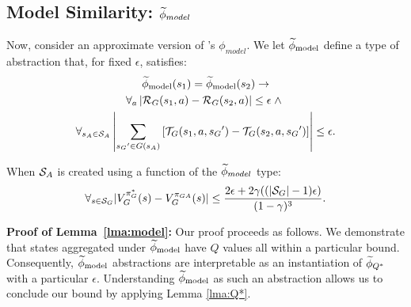 \subsection{Model Similarity: $\widetilde \phi_{model}$}
\label{sec:model}

Now, consider an approximate version of \citeauthor{li2006towards}'s $\phi_{model}$. 
\bdefn{$\epM$}
We let $\epM$ define a type of abstraction that, for fixed $\epsilon$, satisfies:
\begin{multline}
\widetilde \phi_{\text{model}}(s_1) = \widetilde \phi_{\text{model}}(s_2) \rightarrow \\
\forall_a \left| \mathcal{R}_G(s_1, a) - \mathcal{R}_G(s_2, a)\right| \leq \epsilon\; \wedge\ \\
\forall_{s_A \in \mathcal{S}_A} \left|\sum_{{s_G}' \in G(s_A)} \left[\mathcal{T}_G(s_1, a, {s_G}') - \mathcal{T}_G(s_2, a,{s_G}')\right] \right| \leq \epsilon.
\end{multline}
\edefn

\begin{lma}
\label{lma:model}
When $\mathcal{S}_A$ is created using a function of the $\widetilde \phi_{model}$ type:
\begin{equation}
\forall_{s \in \mathcal{S}_G} | V_G^{\pi_G^*}(s) - V_G^{\pi_{GA}}(s) | \leq \frac{2\epsilon + 2\gamma((|\mathcal{S}_G|-1)\epsilon)}{(1-\gamma)^3}.
\end{equation}
\end{lma}

{\bf Proof of Lemma~\ref{lma:model}:} Our proof proceeds as follows. We demonstrate that states aggregated under $\epM$ have $Q$ values all within a particular bound. Consequently, $\epM$ abstractions are interpretable as an instantiation of $\widetilde \phi_{Q^*}$ with a particular $\epsilon$. Understanding $\epM$ as such an abstraction allows us to conclude our bound by applying Lemma \ref{lma:Q*}.

